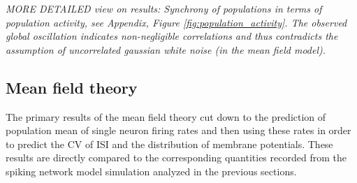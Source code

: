 \emph{MORE DETAILED view on results:
Synchrony of populations in terms of population activity, 
see Appendix, Figure \ref{fig:population_activity}. 
The observed global oscillation indicates non-negligible correlations
and thus contradicts the assumption of uncorrelated gaussian white noise 
(in the mean field model).}

\subsection{Mean field theory}
The primary results of the mean field theory cut down to the prediction of 
population mean of single neuron firing rates and then using these rates 
in order to predict the CV of ISI and the distribution of membrane potentials. 
These results are directly compared to 
the corresponding quantities recorded from the spiking network 
model simulation analyzed in the previous sections. 

